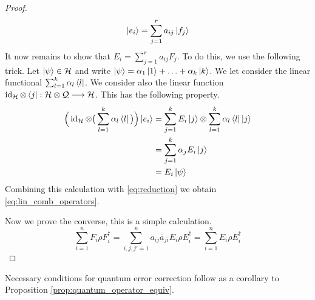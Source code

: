 \documentclass[12pt]{article}
\theoremstyle{plain}
\theoremstyle{definition}
\newcommand{\call}[1]{\mathcal{#1}}
\newcommand{\lto}{\longrightarrow}
\begin{document}
\begin{proof}
		\begin{equation}\label{eq:reduction}
			\ket{e_i} = \sum_{j = 1}^r a_{ij} \ket{f_j}
		\end{equation}
		It now remains to show that $E_i = \sum_{j = 1}^r a_{ij}F_j$. To do this, we use the following trick. Let $\ket{\psi} \in \call{H}$ and write $\ket{\psi} = \alpha_1 \ket{1} + \hdots + \alpha_k \ket{k}$. We let consider the linear functional $\sum_{l = 1}^k \alpha_l \bra{l}$. We consider also the linear function $\operatorname{id}_{\call{H}} \otimes \bra{j}: \call{H} \otimes \call{Q} \lto \call{H}$. This has the following property.
		\begin{align}
			\Big(\operatorname{id}_{\call{H}} \otimes \big(\sum_{l = 1}^k \alpha_l \bra{l}\big)\Big)\ket{e_i} &= \sum_{j = 1}^kE_i\ket{j} \otimes \sum_{l = 1}^k \alpha_l \bra{l}\ket{j}\\
			&= \sum_{j = 1}^k \alpha_j E_i\ket{j}\\
			&= E_i\ket{\psi}
		\end{align}
		Combining this calculation with \eqref{eq:reduction} we obtain \eqref{eq:lin_comb_operators}.
		
		Now we prove the converse, this is a simple calculation.
		\begin{equation}
			\sum_{i = 1}^n F_i \rho F_i^\dagger = \sum_{i, j, j' = 1}^n a_{ij}\overline{a}_{ji}E_i \rho E_i^\dagger = \sum_{i = 1}^n E_i \rho E_i^\dagger
		\end{equation}
	\end{proof}
	
	Necessary conditions for quantum error correction follow as a corollary to Proposition \ref{prop:quantum_operator_equiv}.
	
\end{document}
